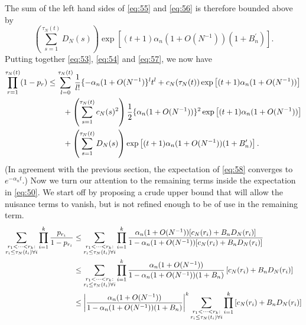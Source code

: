 \documentclass{article}
\newcommand{\1}[1]{\mathbbm{1}_{#1}}
\begin{document}
The sum of the left hand sides of \eqref{eq:55} and \eqref{eq:56} is therefore bounded above by
\begin{equation}\label{eq:57}
\left( \sum_{s=1}^{\tau_N(t)} D_N(s) \right)
\exp \left[ (t+1) \alpha_n (1+O(N^{-1})) (1+B_n^\prime) \right] .
\end{equation}
Putting together \eqref{eq:53}, \eqref{eq:54} and \eqref{eq:57}, we now have
\begin{align}
\prod_{r=1}^{\tau_N(t)} (1-p_r)
&\leq  \sum_{l=0}^{\tau_N(t)} \frac{1}{l!} \{ -\alpha_n(1+O(N^{-1})\}^l t^l
+ c_N(\tau_N(t)) \exp \left[ (t+1) \alpha_n (1+O(N^{-1})) \right] \notag\\
&\qquad+ \left( \sum_{s=1}^{\tau_N(t)} c_N(s)^2 \right) 
\frac{1}{2} \{\alpha_n (1+O(N^{-1}))\}^2
\exp\left[ (t+1) \alpha_n (1+O(N^{-1})) \right] \notag\\
&\qquad+ \left( \sum_{s=1}^{\tau_N(t)} D_N(s) \right)
\exp \left[ (t+1) \alpha_n (1+O(N^{-1})) (1+B_n^\prime) \right] . \label{eq:58}
\end{align}
(In agreement with the previous section, the expectation of \eqref{eq:58} converges to $e^{-\alpha_n t}$.)
Now we turn our attention to the remaining terms inside the expectation in \eqref{eq:50}. We start off by proposing a crude upper bound that will allow the nuisance terms to vanish, but is not refined enough to be of use in the remaining term.
\begin{align}
\sum_{\substack{r_1<\dots<r_k :\\ r_i\leq \tau_N(t_i) \forall i}} \prod_{i=1}^k \frac{p_{r_i}}{1-p_{r_i}}
&\leq \sum_{\substack{r_1<\dots<r_k :\\ r_i\leq \tau_N(t_i) \forall i}} \prod_{i=1}^k
\frac{\alpha_n (1+O(N^{-1})) [ c_N(r_i) + B_n D_N(r_i) ]}{1- \alpha_n (1+O(N^{-1})) [ c_N(r_i) + B_n D_N(r_i) ]} \notag\\
&\leq \sum_{\substack{r_1<\dots<r_k :\\ r_i\leq \tau_N(t_i) \forall i}} \prod_{i=1}^k
\frac{\alpha_n (1+O(N^{-1})) }{1- \alpha_n (1+O(N^{-1})) (1+ B_n) }
\left[ c_N(r_i) + B_n D_N(r_i) \right] \notag\\
&\leq \left| \frac{\alpha_n (1+O(N^{-1})) }{1- \alpha_n (1+O(N^{-1})) (1+ B_n) } \right|^k
\sum_{\substack{r_1<\dots<r_k :\\ r_i\leq \tau_N(t_i) \forall i}} \prod_{i=1}^k
\left[ c_N(r_i) + B_n D_N(r_i) \right]
\end{align}
\end{document}
